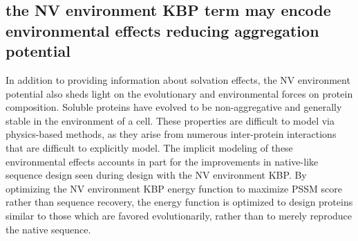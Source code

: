 \subsection{the \acs{NV} environment \acs{KBP} term may encode environmental effects reducing aggregation potential}
In addition to providing information about solvation effects, the \ac{NV} environment potential also sheds light on the evolutionary and environmental forces on protein composition.
Soluble proteins have evolved to be non-aggregative and generally stable in the environment of a cell.
These properties are difficult to model via physics-based methods, as they arise from numerous inter-protein interactions that are difficult to explicitly model.
The implicit modeling of these environmental effects accounts in part for the improvements in native-like sequence design seen during design with the \ac{NV} environment \ac{KBP}.
By optimizing the \ac{NV} environment \ac{KBP} energy function to maximize \ac{PSSM} score rather than sequence recovery, the energy function is optimized to design proteins similar to those which are favored evolutionarily, rather than to merely reproduce the native sequence.